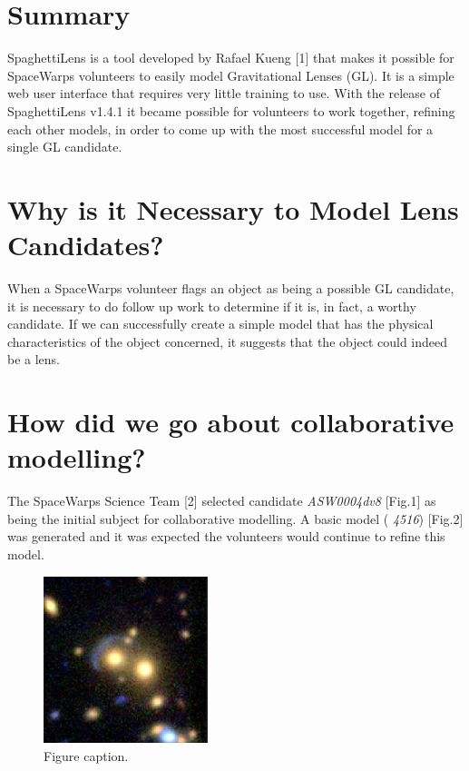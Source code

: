 \documentclass{article}
\begin{document}
\section{Summary}

SpaghettiLens is a tool developed by Rafael Kueng {\small{}[1]} that makes it possible 
for SpaceWarps volunteers to easily model Gravitational Lenses (GL). It is a simple 
web user interface that requires very little training to use. With the release 
of SpaghettiLens v1.4.1 it became possible for volunteers to work together, refining 
each other models, in order to come up with the most successful model for a single 
GL candidate. 

\section{Why is it Necessary to Model Lens Candidates?}

When a SpaceWarps volunteer flags an object as being a possible GL candidate, it 
is necessary to do follow up work to determine if it is, in fact, a worthy candidate. 
If we can successfully create a simple model that has the physical characteristics 
of the object concerned, it suggests that the object could indeed be a lens.

\section{How did we go about collaborative modelling?}

The SpaceWarps Science Team {\small{}[2]} selected candidate {\color{color02} \emph{ASW0004dv8}} 
 [Fig.1] as being the initial subject for collaborative modelling. A basic model 
({\color{color02} \emph{4516}}) [Fig.2] was generated and it was expected the volunteers 
would continue to refine this model.

\begin{figure}
\centering
\includegraphics[width=136pt]{fig/simsModeling-fig001.jpg}
\caption{Figure caption.}
\end{figure}
\end{document}
